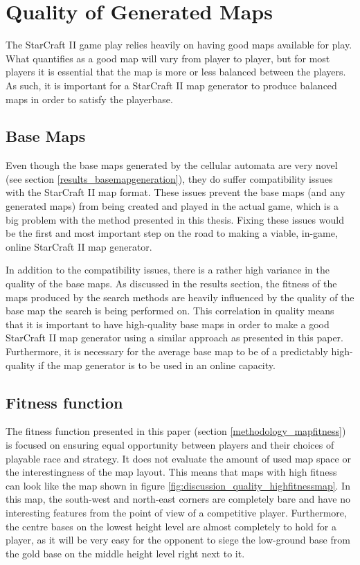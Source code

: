 \section{Quality of Generated Maps}
\label{discussion_quality}
The StarCraft II game play relies heavily on having good maps available for play. What quantifies as a good map will vary from player to player, but for most players it is essential that the map is more or less balanced between the players. As such, it is important for a StarCraft II map generator to produce balanced maps in order to satisfy the playerbase.

\subsection{Base Maps}
\label{discussion_quality_basemaps}
Even though the base maps generated by the cellular automata are very novel (see section \ref{results_basemapgeneration}), they do suffer compatibility issues with the StarCraft II map format. These issues prevent the base maps (and any generated maps) from being created and played in the actual game, which is a big problem with the method presented in this thesis. Fixing these issues would be the first and most important step on the road to making a viable, in-game, online StarCraft II map generator.

In addition to the compatibility issues, there is a rather high variance in the quality of the base maps. As discussed in the results section, the fitness of the maps produced by the search methods are heavily influenced by the quality of the base map the search is being performed on. This correlation in quality means that it is important to have high-quality base maps in order to make a good StarCraft II map generator using a similar approach as presented in this paper. Furthermore, it is necessary for the average base map to be of a predictably high-quality if the map generator is to be used in an online capacity. 

\subsection{Fitness function}
\label{discussion_quality_fitnessfunction}
The fitness function presented in this paper (section \ref{methodology_mapfitness}) is focused on ensuring equal opportunity between players and their choices of playable race and strategy. It does not evaluate the amount of used map space or the interestingness of the map layout. This means that maps with high fitness can look like the map shown in figure \ref{fig:discussion_quality_highfitnessmap}. In this map, the south-west and north-east corners are completely bare and have no interesting features from the point of view of a competitive player. Furthermore, the centre bases on the lowest height level are almost completely to hold for a player, as it will be very easy for the opponent to siege the low-ground base from the gold base on the middle height level right next to it.

